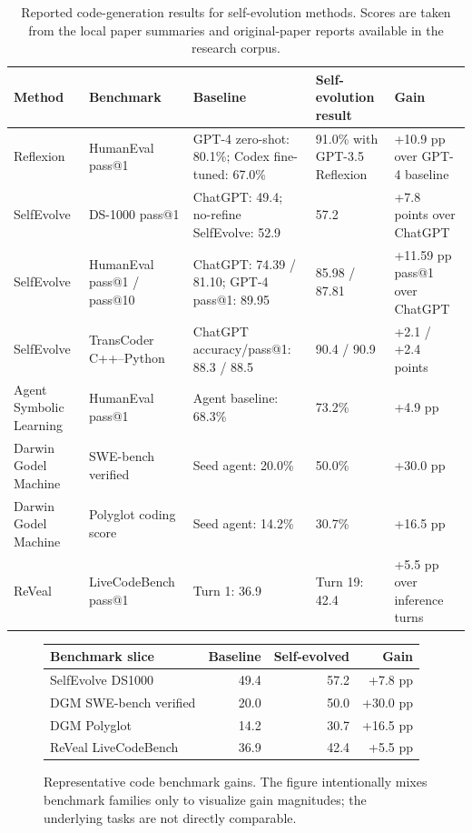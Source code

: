 \begin{table}[t]
\centering
\TableTight
\caption{Reported code-generation results for self-evolution methods. Scores are taken from the local paper summaries and original-paper reports available in the research corpus.}
\label{tab:code-exact-scores}
\begin{tabularx}{\textwidth}{@{}L{0.16\textwidth}L{0.17\textwidth}L{0.22\textwidth}L{0.20\textwidth}Y@{}}
\toprule
\textbf{Method} & \textbf{Benchmark} & \textbf{Baseline} & \textbf{Self-evolution result} & \textbf{Gain} \\
\midrule
Reflexion & HumanEval pass@1 & GPT-4 zero-shot: 80.1\%; Codex fine-tuned: 67.0\% & 91.0\% with GPT-3.5 Reflexion & +10.9 pp over GPT-4 baseline \\
SelfEvolve & DS-1000 pass@1 & ChatGPT: 49.4; no-refine SelfEvolve: 52.9 & 57.2 & +7.8 points over ChatGPT \\
SelfEvolve & HumanEval pass@1 / pass@10 & ChatGPT: 74.39 / 81.10; GPT-4 pass@1: 89.95 & 85.98 / 87.81 & +11.59 pp pass@1 over ChatGPT \\
SelfEvolve & TransCoder C++--Python & ChatGPT accuracy/pass@1: 88.3 / 88.5 & 90.4 / 90.9 & +2.1 / +2.4 points \\
Agent Symbolic Learning & HumanEval pass@1 & Agent baseline: 68.3\% & 73.2\% & +4.9 pp \\
Darwin Godel Machine & SWE-bench verified & Seed agent: 20.0\% & 50.0\% & +30.0 pp \\
Darwin Godel Machine & Polyglot coding score & Seed agent: 14.2\% & 30.7\% & +16.5 pp \\
ReVeal & LiveCodeBench pass@1 & Turn 1: 36.9 & Turn 19: 42.4 & +5.5 pp over inference turns \\
\bottomrule
\end{tabularx}
\end{table}

\begin{figure}[t]
\centering
\begin{tabular}{lrrr}
\toprule
Benchmark slice & Baseline & Self-evolved & Gain \\
\midrule
SelfEvolve DS1000 & 49.4 & 57.2 & +7.8 pp \\
DGM SWE-bench verified & 20.0 & 50.0 & +30.0 pp \\
DGM Polyglot & 14.2 & 30.7 & +16.5 pp \\
ReVeal LiveCodeBench & 36.9 & 42.4 & +5.5 pp \\
\bottomrule
\end{tabular}
\caption{Representative code benchmark gains. The figure intentionally mixes benchmark families only to visualize gain magnitudes; the underlying tasks are not directly comparable.}
\label{fig:code-gains}
\end{figure}

